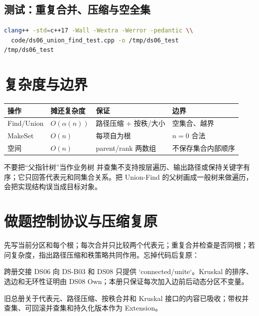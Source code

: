 \documentclass[UTF8,fontset=none,11pt,a4paper]{ctexart}
\begin{document}
\subsection{测试：重复合并、压缩与空全集}

\begin{lstlisting}[language=bash]
clang++ -std=c++17 -Wall -Wextra -Werror -pedantic \\
  code/ds06_union_find_test.cpp -o /tmp/ds06_test
/tmp/ds06_test
\end{lstlisting}

\section{复杂度与边界}
\begin{center}\small
\begin{tabularx}{\linewidth}{L{2.4cm}C{2cm}YY}\toprule
操作 & 摊还复杂度 & 保证 & 边界\\\midrule
Find/Union & $O(\alpha(n))$ & 路径压缩 + 按秩/大小 & 空集合、越界\\
MakeSet & $O(n)$ & 每项自为根 & $n=0$ 合法\\
空间 & $O(n)$ & parent/rank 两数组 & 不保存集合内部顺序\\
\bottomrule\end{tabularx}\end{center}
\begin{warnbox}{不要把“父指针树”当作业务树}
并查集不支持按层遍历、输出路径或保持关键字有序；它只回答代表元和同集合关系。把 Union-Find 的父树画成一般树来做遍历，会把实现结构误当成目标对象。
\end{warnbox}

\section{做题控制协议与压缩复原}
先写当前分区和每个根；每次合并只比较两个代表元；重复合并检查是否同根；若问复杂度，指出路径压缩和秩策略共同作用。忘掉代码后复原：
\begin{corebox}{跨册交接}
DS06 向 DS-B03 和 DS08 只提供 `connected/unite`。Kruskal 的排序、选边和无环性证明由 DS08 Own；本册只保证每次加入边前后动态分区不变量。
\end{corebox}
旧总册关于代表元、路径压缩、按秩合并和 Kruskal 接口的内容已吸收；带权并查集、可回滚并查集和持久化版本作为 Extension。
\end{document}
